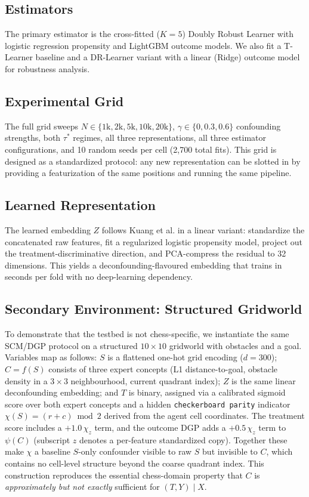 \documentclass{article}
\begin{document}
\subsection{Estimators}
The primary estimator is the cross-fitted ($K{=}5$) Doubly Robust
Learner\cite{chernozhukov2018double} with logistic regression propensity and
LightGBM outcome models. We also fit a T-Learner baseline and a DR-Learner variant
with a linear (Ridge) outcome model for robustness analysis.

\subsection{Experimental Grid}
The full grid sweeps $N \in \{1\text{k}, 2\text{k}, 5\text{k}, 10\text{k},
20\text{k}\}$, $\gamma \in \{0, 0.3, 0.6\}$ confounding strengths, both $\tau^*$
regimes, all three representations, all three estimator configurations, and 10
random seeds per cell (2{,}700 total fits). This grid is designed as a standardized
protocol: any new representation can be slotted in by providing a featurization of
the same positions and running the same pipeline.

\subsection{Learned Representation}
The learned embedding $Z$ follows Kuang et al.\cite{kuang2020information} in a
linear variant: standardize the concatenated raw features, fit a regularized
logistic propensity model, project out the treatment-discriminative direction, and
PCA-compress the residual to 32 dimensions. This yields a deconfounding-flavoured
embedding that trains in seconds per fold with no deep-learning
dependency.\cite{deconfoundingScores}

\subsection{Secondary Environment: Structured Gridworld}
To demonstrate that the testbed is not chess-specific, we instantiate the same
SCM/DGP protocol on a structured $10 \times 10$ gridworld with obstacles and a
goal. Variables map as follows: $S$ is a flattened one-hot grid encoding ($d = 300$);
$C = f(S)$ consists of three expert concepts (L1 distance-to-goal, obstacle density
in a $3 \times 3$ neighbourhood, current quadrant index); $Z$ is the same linear
deconfounding embedding; and $T$ is binary, assigned via a calibrated sigmoid
score over both expert concepts and a hidden \texttt{checkerboard parity}
indicator $\chi(S) = (r + c) \bmod 2$ derived from the agent cell coordinates.
The treatment score includes a $+1.0\,\chi_z$ term, and the outcome DGP adds a
$+0.5\,\chi_z$ term to $\psi(C)$ (subscript $z$ denotes a per-feature standardized
copy). Together these make $\chi$ a baseline $S$-only confounder visible to raw
$S$ but invisible to $C$, which contains no cell-level structure beyond the
coarse quadrant index. This construction reproduces the essential chess-domain
property that $C$ is \emph{approximately but not exactly} sufficient for $(T,Y)
\mid X$.
\end{document}
